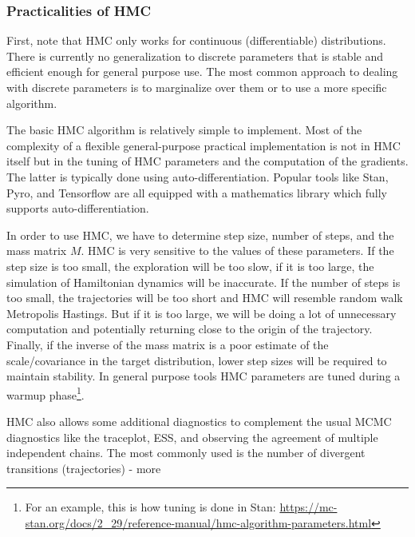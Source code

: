 \documentclass{book}
\theoremstyle{plain}%
\theoremstyle{definition}
\begin{document}
\subsubsection*{Practicalities of HMC}

First, note that HMC only works for continuous (differentiable) distributions. There is currently no generalization to discrete parameters that is stable and efficient enough for general purpose use. The most common approach to dealing with discrete parameters is to marginalize over them or to use a more specific algorithm.

The basic HMC algorithm is relatively simple to implement. Most of the complexity of a flexible general-purpose practical implementation is not in HMC itself but in the tuning of HMC parameters and the computation of the gradients. The latter is typically done using auto-differentiation. Popular tools like Stan, Pyro, and Tensorflow are all equipped with a mathematics library which fully supports auto-differentiation.

In order to use HMC, we have to determine step size, number of steps, and the mass matrix $M$. HMC is very sensitive to the values of these parameters. If the step size is too small, the exploration will be too slow, if it is too large, the simulation of Hamiltonian dynamics will be inaccurate. If the number of steps is too small, the trajectories will be too short and HMC will resemble random walk Metropolis Hastings. But if it is too large, we will be doing a lot of unnecessary computation and potentially returning close to the origin of the trajectory. Finally, if the inverse of the mass matrix is a poor estimate of the scale/covariance in the target distribution, lower step sizes will be required to maintain stability. In general purpose tools HMC parameters are tuned during a warmup phase\footnote{For an example, this is how tuning is done in Stan: \url{https://mc-stan.org/docs/2_29/reference-manual/hmc-algorithm-parameters.html}}.

HMC also allows some additional diagnostics to complement the usual MCMC diagnostics like the traceplot, ESS, and observing the agreement of multiple independent chains. The most commonly used is the number of divergent transitions (trajectories) - more




\end{document}
